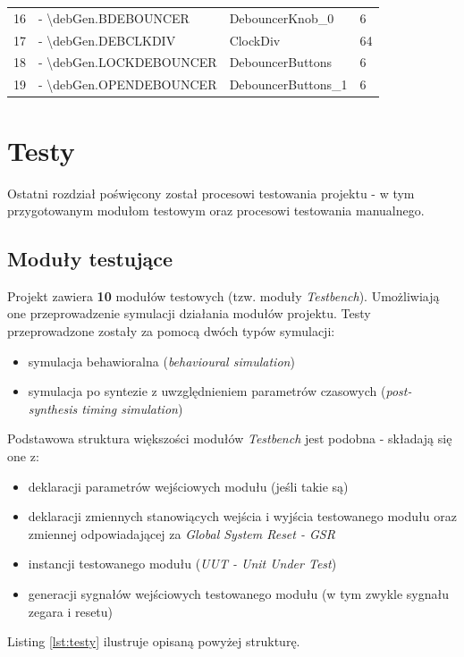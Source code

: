 \documentclass[12pt] {article}
\begin{document}
\begin{table}[H]
\begin{tabular}{@{}llll@{}}
16        & - \textbackslash{}debGen.BDEBOUNCER    & DebouncerKnob\_0           & 6                        \\
17        & - \textbackslash{}debGen.DEBCLKDIV     & ClockDiv                   & 64                       \\
18        & - \textbackslash{}debGen.LOCKDEBOUNCER & DebouncerButtons           & 6                        \\
19        & - \textbackslash{}debGen.OPENDEBOUNCER & DebouncerButtons\_1        & 6                        \\ \bottomrule
\end{tabular}
\label{table:tabcells}
\end{table}

\newpage
\section{Testy}
Ostatni rozdział poświęcony został procesowi testowania projektu - w tym przygotowanym modułom testowym oraz procesowi testowania manualnego. 

\subsection{Moduły testujące}
Projekt zawiera \textbf{10} modułów testowych (tzw. moduły \textit{Testbench}). Umożliwiają one przeprowadzenie symulacji działania modułów projektu. Testy przeprowadzone zostały za pomocą dwóch typów symulacji:
\begin{itemize}
\item symulacja behawioralna (\textit{behavioural simulation})
\item symulacja po syntezie z uwzględnieniem parametrów czasowych (\textit{post-synthesis timing simulation})
\end{itemize}
Podstawowa struktura większości modułów \textit{Testbench} jest podobna - składają się one z:
\begin{itemize}
\item deklaracji parametrów wejściowych modułu (jeśli takie są)
\item deklaracji zmiennych stanowiących wejścia i wyjścia testowanego modułu oraz zmiennej odpowiadającej za \textit{Global System Reset - GSR}
\item instancji testowanego modułu (\textit{UUT - Unit Under Test})
\item generacji sygnałów wejściowych testowanego modułu (w tym zwykle sygnału zegara i resetu)
\end{itemize}
Listing \ref{lst:testy} ilustruje opisaną powyżej strukturę.
\end{document}
